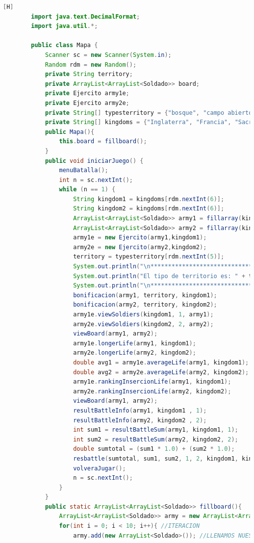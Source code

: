 \documentclass{article}
\begin{document}
	\begin{lstlisting}[language=java,caption={Las lineas de codigos de la clase Mapa creada:}][H]
		import java.text.DecimalFormat;
		import java.util.*;
		
		public class Mapa {
			Scanner sc = new Scanner(System.in);
			Random rdm = new Random();
			private String territory;
			private ArrayList<ArrayList<Soldado>> board;
			private Ejercito army1e;
			private Ejercito army2e;
			private String[] typesterritory = {"bosque", "campo abierto", "montana", "desierto", "playa"};
			private String[] kingdoms = {"Inglaterra", "Francia", "Sacro", "Castilla", "Aragon", "Moros"};
			public Mapa(){
				this.board = fillboard();
			}
			public void iniciarJuego() {
				menuBatalla();
				int n = sc.nextInt();
				while (n == 1) {
					String kingdom1 = kingdoms[rdm.nextInt(6)];
					String kingdom2 = kingdoms[rdm.nextInt(6)];
					ArrayList<ArrayList<Soldado>> army1 = fillarray(kingdom1, 1);
					ArrayList<ArrayList<Soldado>> army2 = fillarray(kingdom2, 2);
					army1e = new Ejercito(army1,kingdom1);
					army2e = new Ejercito(army2,kingdom2);
					territory = typesterritory[rdm.nextInt(5)];
					System.out.println("\n*********************************");
					System.out.println("El tipo de territorio es: " + territory);
					System.out.println("\n*********************************");
					bonificacion(army1, territory, kingdom1);
					bonificacion(army2, territory, kingdom2);
					army1e.viewSoldiers(kingdom1, 1, army1);
					army2e.viewSoldiers(kingdom2, 2, army2);
					viewBoard(army1, army2);
					army1e.longerLife(army1, kingdom1);
					army2e.longerLife(army2, kingdom2);
					double avg1 = army1e.averageLife(army1, kingdom1);
					double avg2 = army2e.averageLife(army2, kingdom2);
					army1e.rankingInsercionLife(army1, kingdom1);
					army2e.rankingInsercionLife(army2, kingdom2);
					viewBoard(army1, army2);
					resultBattleInfo(army1, kingdom1 , 1);
					resultBattleInfo(army2, kingdom2 , 2);
					int sum1 = resultBattleSum(army1, kingdom1, 1);
					int sum2 = resultBattleSum(army2, kingdom2, 2);
					double sumtotal = (sum1 * 1.0) + (sum2 * 1.0);
					resbattle(sumtotal, sum1, sum2, 1, 2, kingdom1, kingdom2);
					volveraJugar();
					n = sc.nextInt();
				}
			}
			public static ArrayList<ArrayList<Soldado>> fillboard(){
				ArrayList<ArrayList<Soldado>> army = new ArrayList<ArrayList<Soldado>>();
				for(int i = 0; i < 10; i++){ //ITERACION
					army.add(new ArrayList<Soldado>()); //LLENAMOS NUESTROS ARRAYLIST BIDIMENSIONAL CON CADA FILA PARA QUE CUMPLAN CON ESTRUCTURA DEL TABLERO

\end{lstlisting}
\end{document}
